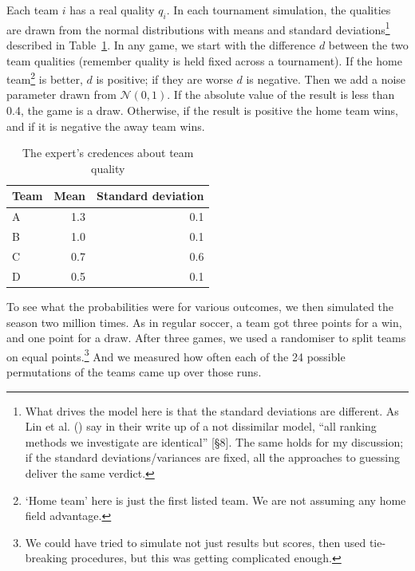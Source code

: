 \documentclass[
  11pt,
  letterpaper,
  DIV=11,
  numbers=noendperiod,
  twoside]{scrartcl}
\begin{document}
Each team \(i\) has a real quality \(q_i\). In each tournament
simulation, the qualities are drawn from the normal distributions with
means and standard deviations\footnote{What drives the model here is
  that the standard deviations are different. As Lin et al.
  () say in their write up of a not
  dissimilar model, ``all ranking methods we investigate are identical''
  {[}§8{]}. The same holds for my discussion; if the standard
  deviations/variances are fixed, all the approaches to guessing deliver
  the same verdict.} described in Table~\ref{tbl-quality}. In any game,
we start with the difference \(d\) between the two team qualities
(remember quality is held fixed across a tournament). If the home
team\footnote{`Home team' here is just the first listed team. We are not
  assuming any home field advantage.} is better, \(d\) is positive; if
they are worse \(d\) is negative. Then we add a noise parameter drawn
from \(\mathcal{N}(0, 1)\). If the absolute value of the result is less
than 0.4, the game is a draw. Otherwise, if the result is positive the
home team wins, and if it is negative the away team wins.

{

\begin{longtable}[]{@{}lrr@{}}

\caption{\label{tbl-quality}The expert's credences about team quality}

\tabularnewline

\toprule\noalign{}
Team & Mean & Standard deviation \\
\midrule\noalign{}
\endhead
\bottomrule\noalign{}
\endlastfoot
A & 1.3 & 0.1 \\
B & 1.0 & 0.1 \\
C & 0.7 & 0.6 \\
D & 0.5 & 0.1 \\

\end{longtable}

}

To see what the probabilities were for various outcomes, we then
simulated the season two million times. As in regular soccer, a team got
three points for a win, and one point for a draw. After three games, we
used a randomiser to split teams on equal points.\footnote{We could have
  tried to simulate not just results but scores, then used tie-breaking
  procedures, but this was getting complicated enough.} And we measured
how often each of the 24 possible permutations of the teams came up over
those runs.
\end{document}
